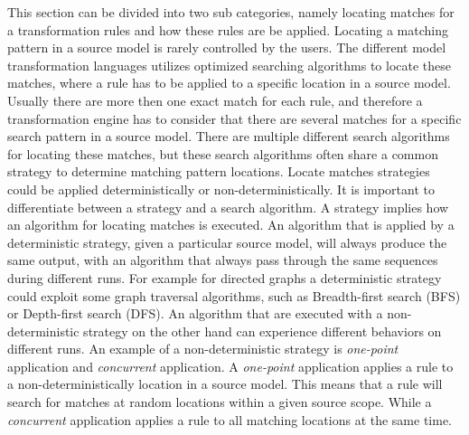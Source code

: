 This section can be divided into two sub categories, namely locating matches for
a transformation rules and how these rules are be applied. Locating a matching
pattern in a source model is rarely controlled by the users. The different
model transformation languages utilizes optimized searching algorithms to
locate these matches, where a rule has to be applied to a specific location in
a source model. Usually there are more then one exact match for each rule, and
therefore a transformation engine has to consider that there are several
matches for a specific search pattern in a source model. There are multiple
different search algorithms for locating these matches, but these search
algorithms often share a common strategy to determine matching pattern
locations. Locate matches strategies could be applied deterministically or
non-deterministically. It is important to differentiate between a
strategy and a search algorithm. A strategy implies how an algorithm for
locating matches is executed. An algorithm that is applied by a deterministic
strategy, given a particular source model, will always produce the same output,
with an algorithm that always pass through the same sequences during different
runs. For example for directed graphs a deterministic strategy could exploit
some graph traversal algorithms, such as Breadth-first
search\cite{Dasgupta2006} (BFS) or Depth-first\cite{Dasgupta2006} search (DFS).
An algorithm that are executed with a non-deterministic strategy on the other
hand can experience different behaviors on different runs. An example of a
non-deterministic strategy is \textit{one-point}
application\cite{Czarnecki2006} and \textit{concurrent} application. A
\textit{one-point} application applies a rule to a non-deterministically
location in a source model. This means that a rule will search for matches at
random locations within a given source scope.
While a \textit{concurrent} application applies a rule to all matching
locations at the same time. 

